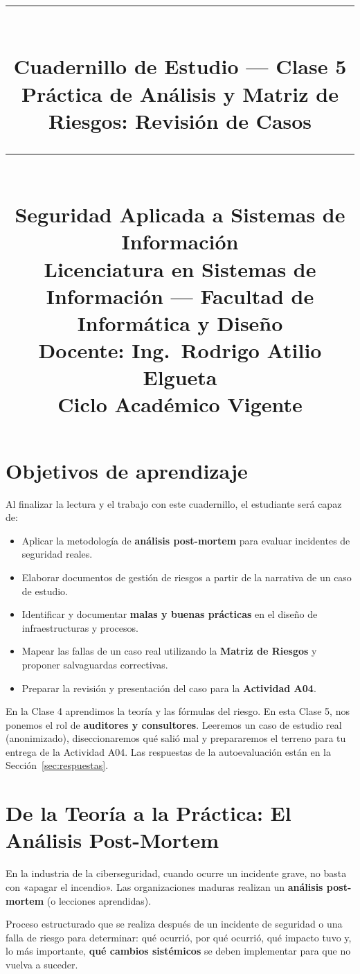 \documentclass[11pt,a4paper]{article}
\title{%
  \rule{\textwidth}{1pt}\\[0.4cm]
  \textbf{\Large Cuadernillo de Estudio --- Clase 5}\\[0.2cm]
  \large Práctica de Análisis y Matriz de Riesgos: Revisión de Casos\\[0.2cm]
  \rule{\textwidth}{1pt}\\[0.4cm]
  \normalsize Seguridad Aplicada a Sistemas de Información\\
  Licenciatura en Sistemas de Información --- Facultad de Informática y Diseño\\
  Docente: Ing.\ Rodrigo Atilio Elgueta\\[0.2cm]
  \small Ciclo Académico Vigente
}
\author{}
\date{}
\begin{document}
\maketitle
\thispagestyle{fancy}
\tableofcontents
\newpage

\section{Objetivos de aprendizaje}
Al finalizar la lectura y el trabajo con este cuadernillo, el estudiante será capaz de:

\begin{itemize}[leftmargin=*]
  \item Aplicar la metodología de \textbf{análisis post-mortem} para evaluar incidentes de seguridad reales.
  \item Elaborar documentos de gestión de riesgos a partir de la narrativa de un caso de estudio.
  \item Identificar y documentar \textbf{malas y buenas prácticas} en el diseño de infraestructuras y procesos.
  \item Mapear las fallas de un caso real utilizando la \textbf{Matriz de Riesgos} y proponer salvaguardas correctivas.
  \item Preparar la revisión y presentación del caso para la \textbf{Actividad A04}.
\end{itemize}

\begin{clave}
En la Clase 4 aprendimos la teoría y las fórmulas del riesgo. En esta Clase 5, nos ponemos el rol de \textbf{auditores y consultores}. Leeremos un caso de estudio real (anonimizado), diseccionaremos qué salió mal y prepararemos el terreno para tu entrega de la Actividad A04. Las respuestas de la autoevaluación están en la Sección~\ref{sec:respuestas}.
\end{clave}

\section{De la Teoría a la Práctica: El Análisis Post-Mortem}
En la industria de la ciberseguridad, cuando ocurre un incidente grave, no basta con «apagar el incendio». Las organizaciones maduras realizan un \textbf{análisis post-mortem} (o lecciones aprendidas). 

\begin{definicion}
Proceso estructurado que se realiza después de un incidente de seguridad o una falla de riesgo para determinar: qué ocurrió, por qué ocurrió, qué impacto tuvo y, lo más importante, \textbf{qué cambios sistémicos} se deben implementar para que no vuelva a suceder.
\end{definicion}
\end{document}
